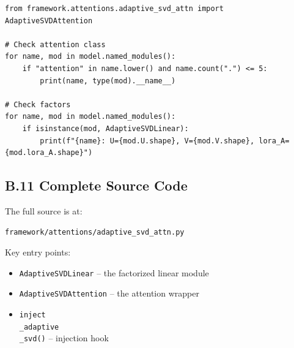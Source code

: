 \begin{lstlisting}
from framework.attentions.adaptive_svd_attn import AdaptiveSVDAttention

# Check attention class
for name, mod in model.named_modules():
    if "attention" in name.lower() and name.count(".") <= 5:
        print(name, type(mod).__name__)

# Check factors
for name, mod in model.named_modules():
    if isinstance(mod, AdaptiveSVDLinear):
        print(f"{name}: U={mod.U.shape}, V={mod.V.shape}, lora_A={mod.lora_A.shape}")
\end{lstlisting}

\subsection{B.11 Complete Source Code}

The full source is at:

\begin{lstlisting}
framework/attentions/adaptive_svd_attn.py
\end{lstlisting}

Key entry points:
\begin{itemize}
\item \texttt{AdaptiveSVDLinear} -- the factorized linear module
\end{itemize}
\begin{itemize}
\item \texttt{AdaptiveSVDAttention} -- the attention wrapper
\end{itemize}
\begin{itemize}
\item \texttt{inject\\_adaptive\\_svd()} -- injection hook
\end{itemize}